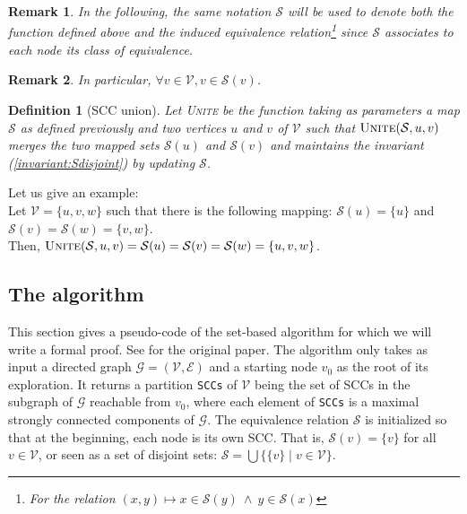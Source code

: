 \documentclass[a4 paper, 12pt]{article}
\def\GG{\ensuremath{\mathcal{G}}}
\def\VV{\ensuremath{\mathcal{V}}}
\def\EE{\ensuremath{\mathcal{E}}}
\newtheorem{definition}{Definition}
\newtheorem{remark}{Remark}
\begin{document}
\begin{remark}
    In the following, the same notation $\mathcal{S}$ will be used to denote both the function defined above and the induced equivalence relation\footnote{For the relation $(x, y) \mapsto x \in \mathcal{S}(y) ~\land~ y \in \mathcal{S}(x) $} since $\mathcal{S}$ associates to each node its class of equivalence. 
\end{remark}

\begin{remark}
    In particular, $\forall v \in \mathcal{V}, v \in \mathcal{S}(v)$.
\end{remark}

\begin{definition}[SCC union]
    Let \textsc{Unite} be the function taking as parameters a map $\mathcal{S}$ as defined previously and two vertices $u$ and $v$ of $\mathcal{V}$ such that $\textsc{Unite}(\mathcal{S}, u, v)$ merges the two mapped sets $\mathcal{S}(u)$ and $\mathcal{S}(v)$ and maintains the invariant (\ref{invariant:Sdisjoint}) by updating $\mathcal{S}$.
\end{definition}
Let us give an example:\\
Let $\mathcal{V} = \{u,v,w\}$ such that there is the following mapping: $\mathcal{S}(u) = \{u\}$ and $\mathcal{S}(v) = \mathcal{S}(w) = \{v,w\}$.\\
Then, $\textsc{Unite}(\mathcal{S}, u, v) = \mathcal{S}(u) = \mathcal{S}(v) = \mathcal{S}(w) = \{u,v,w\}$.  

\subsection{The algorithm}
This section gives a pseudo-code of the set-based algorithm for which we will write a formal proof. See \cite{bloemen_strong_2019} for the original paper.
\BlankLine
The algorithm only takes as input a directed graph $\GG = (\VV, \EE)$ and a starting node $v_0$ as the root of its exploration. It returns a partition \texttt{SCCs} of \VV \xspace being the set of SCCs in the subgraph of \GG\xspace reachable from $v_0$, where each element of \texttt{SCCs} is a maximal strongly connected components of \GG. The equivalence relation $\mathcal{S}$ is initialized so that at the beginning, each node is its own SCC. That is, $\mathcal{S}(v) = \{v\}$ for all $v \in \VV$, or seen as a set of disjoint sets: $\mathcal{S} = \bigcup \{ \{v\} \mid v \in \VV \}$.\\
\BlankLine
\end{document}
